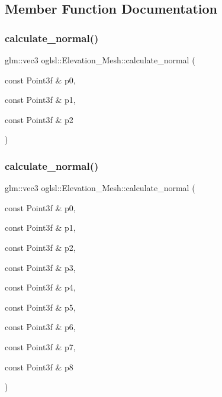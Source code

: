 \subsection{Member Function Documentation}
\mbox{\label{classoglsl_1_1_elevation___mesh_ad141ee161715d896f41ca7b31b9d0c7d}} 
\subsubsection{\texorpdfstring{calculate\+\_\+normal()}{calculate\_normal()}\hspace{0.1cm}{\footnotesize\ttfamily [1/2]}}
{\footnotesize\ttfamily glm\+::vec3 oglsl\+::\+Elevation\+\_\+\+Mesh\+::calculate\+\_\+normal (\begin{DoxyParamCaption}\item[{const Point3f \&}]{p0,  }\item[{const Point3f \&}]{p1,  }\item[{const Point3f \&}]{p2 }\end{DoxyParamCaption})}

\mbox{\label{classoglsl_1_1_elevation___mesh_a768320a6bdacdeff34528c0c08f92b5c}} 
\subsubsection{\texorpdfstring{calculate\+\_\+normal()}{calculate\_normal()}\hspace{0.1cm}{\footnotesize\ttfamily [2/2]}}
{\footnotesize\ttfamily glm\+::vec3 oglsl\+::\+Elevation\+\_\+\+Mesh\+::calculate\+\_\+normal (\begin{DoxyParamCaption}\item[{const Point3f \&}]{p0,  }\item[{const Point3f \&}]{p1,  }\item[{const Point3f \&}]{p2,  }\item[{const Point3f \&}]{p3,  }\item[{const Point3f \&}]{p4,  }\item[{const Point3f \&}]{p5,  }\item[{const Point3f \&}]{p6,  }\item[{const Point3f \&}]{p7,  }\item[{const Point3f \&}]{p8 }\end{DoxyParamCaption})}

